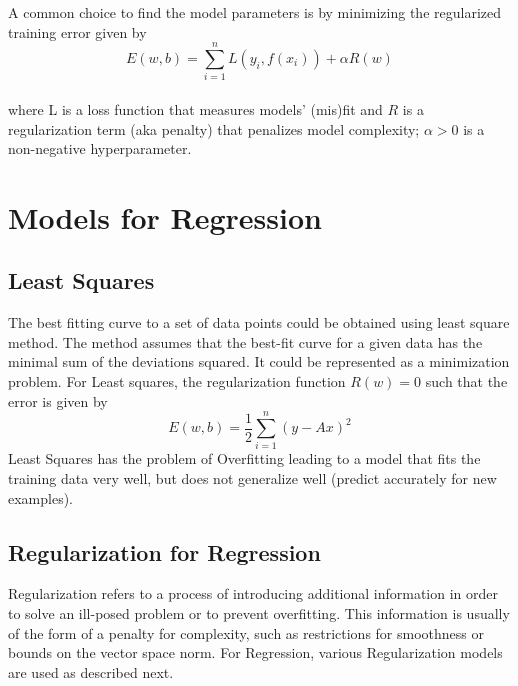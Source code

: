 \documentclass{sigplanconf}
\begin{document}
\noindent
A common choice to find the model parameters is by minimizing the regularized training error given by\\
\begin{equation} E(w,b) = \sum_{i=1}^{n} L(y_i,f(x_i)) + \alpha R(w) \end{equation} \\
where L is a loss function that measures models' (mis)fit and \begin{math}R\end{math} is a
regularization term (aka penalty) that penalizes model complexity; \begin{math}\alpha>0\end{math}
is a non-negative hyperparameter.

\section{Models for Regression}
\subsection{Least Squares}
The best fitting curve to a set of data points could be obtained using least square method. The method
assumes that the best-fit curve for a given data has the minimal sum of the deviations squared. It could
be represented as a minimization problem. For Least squares, the regularization function \begin{math}R(w)=0\end{math}
such that the error is given by \\
\begin{equation} E(w,b) =\frac{1}{2} \sum_{i=1}^{n} (y-Ax)^2\end{equation}
Least Squares has the problem of Overfitting leading to a model that fits the training data very well, but does not generalize well (predict accurately for new examples).

\subsection{Regularization for Regression}
Regularization refers to a process of introducing additional information in order to solve an ill-posed problem or to prevent overfitting. 
This information is usually of the form of a penalty for complexity, such as restrictions for smoothness or bounds on the vector space norm.
For Regression, various Regularization models are used as described next.
\end{document}
